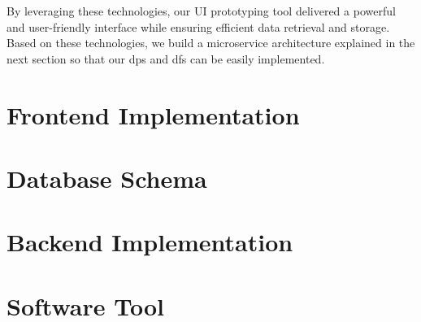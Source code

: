 By leveraging these technologies, our UI prototyping tool delivered a powerful and user-friendly interface while ensuring efficient data retrieval and storage.
Based on these technologies, we build a microservice architecture explained in the next section so that our \ac{dp}s and \ac{df}s can be easily implemented. 
\clearpage


\section{Frontend Implementation}
\label{implementation:section:frontend}

\section{Database Schema}
\label{implementation:section:database}

\section{Backend Implementation}
\label{implementation:section:backend}

\section{Software Tool}
\label{implementation:section:tool}
